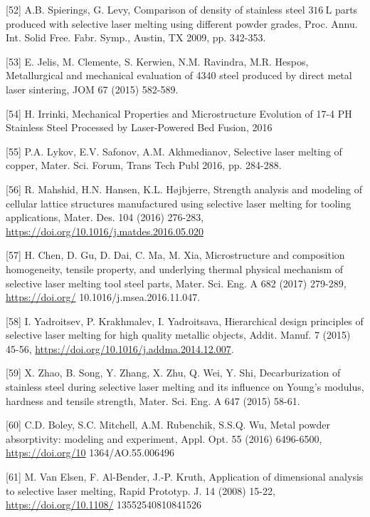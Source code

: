 \documentclass[10pt]{article}
\begin{document}
[52] A.B. Spierings, G. Levy, Comparison of density of stainless steel $316 \mathrm{~L}$ parts produced with selective laser melting using different powder grades, Proc. Annu. Int. Solid Free. Fabr. Symp., Austin, TX 2009, pp. 342-353.

[53] E. Jelis, M. Clemente, S. Kerwien, N.M. Ravindra, M.R. Hespos, Metallurgical and mechanical evaluation of 4340 steel produced by direct metal laser sintering, JOM 67 (2015) 582-589.

[54] H. Irrinki, Mechanical Properties and Microstructure Evolution of 17-4 PH Stainless Steel Processed by Laser-Powered Bed Fusion, 2016

[55] P.A. Lykov, E.V. Safonov, A.M. Akhmedianov, Selective laser melting of copper, Mater. Sci. Forum, Trans Tech Publ 2016, pp. 284-288.

[56] R. Mahshid, H.N. Hansen, K.L. Højbjerre, Strength analysis and modeling of cellular lattice structures manufactured using selective laser melting for tooling applications, Mater. Des. 104 (2016) 276-283, \href{https://doi.org/10.1016/j.matdes.2016.05.020}{https://doi.org/10.1016/j.matdes.2016.05.020}

[57] H. Chen, D. Gu, D. Dai, C. Ma, M. Xia, Microstructure and composition homogeneity, tensile property, and underlying thermal physical mechanism of selective laser melting tool steel parts, Mater. Sci. Eng. A 682 (2017) 279-289, \href{https://doi.org/}{https://doi.org/} 10.1016/j.msea.2016.11.047.

[58] I. Yadroitsev, P. Krakhmalev, I. Yadroitsava, Hierarchical design principles of selective laser melting for high quality metallic objects, Addit. Manuf. 7 (2015) 45-56, \href{https://doi.org/10.1016/j.addma.2014.12.007}{https://doi.org/10.1016/j.addma.2014.12.007}.

[59] X. Zhao, B. Song, Y. Zhang, X. Zhu, Q. Wei, Y. Shi, Decarburization of stainless steel during selective laser melting and its influence on Young's modulus, hardness and tensile strength, Mater. Sci. Eng. A 647 (2015) 58-61.

[60] C.D. Boley, S.C. Mitchell, A.M. Rubenchik, S.S.Q. Wu, Metal powder absorptivity: modeling and experiment, Appl. Opt. 55 (2016) 6496-6500, \href{https://doi.org/10}{https://doi.org/10} 1364/AO.55.006496

[61] M. Van Elsen, F. Al-Bender, J.-P. Kruth, Application of dimensional analysis to selective laser melting, Rapid Prototyp. J. 14 (2008) 15-22, \href{https://doi.org/10.1108/}{https://doi.org/10.1108/} 13552540810841526
\end{document}
